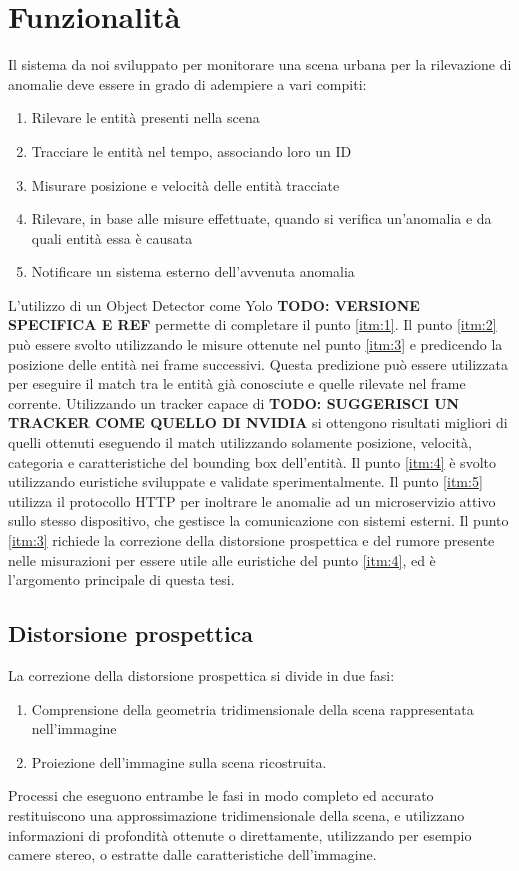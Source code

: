 \chapter{Funzionalità}
\label{sec:funzionalita}

Il sistema da noi sviluppato per monitorare una scena urbana per la rilevazione di anomalie deve essere in grado di adempiere a vari compiti:
\begin{enumerate}
    \item \label{itm:1} Rilevare le entità presenti nella scena
    \item \label{itm:2} Tracciare le entità nel tempo, associando loro un ID
    \item \label{itm:3} Misurare posizione e velocità delle entità tracciate
    \item \label{itm:4} Rilevare, in base alle misure effettuate, quando si verifica un'anomalia e da quali entità essa è causata
    \item \label{itm:5} Notificare un sistema esterno dell'avvenuta anomalia
\end{enumerate}

L'utilizzo di un Object Detector come Yolo \textbf{TODO: VERSIONE SPECIFICA E REF} permette di completare il punto \ref{itm:1}.
Il punto \ref{itm:2} può essere svolto utilizzando le misure ottenute nel punto \ref{itm:3} e predicendo la posizione delle entità nei frame successivi. 
Questa predizione può essere utilizzata per eseguire il match tra le entità già conosciute e quelle rilevate nel frame corrente. 
Utilizzando un tracker capace di \textbf{TODO: SUGGERISCI UN TRACKER COME QUELLO DI NVIDIA} si ottengono risultati migliori di quelli ottenuti eseguendo il match utilizzando solamente posizione, velocità, categoria e caratteristiche del bounding box dell'entità.
Il punto \ref{itm:4} è svolto utilizzando euristiche sviluppate e validate sperimentalmente. 
Il punto \ref{itm:5} utilizza il protocollo HTTP per inoltrare le anomalie ad un microservizio attivo sullo stesso dispositivo, che gestisce la comunicazione con sistemi esterni.
Il punto \ref{itm:3} richiede la correzione della distorsione prospettica e del rumore presente nelle misurazioni per essere utile alle euristiche del punto \ref{itm:4}, ed è l'argomento principale di questa tesi.

\section{Distorsione prospettica}
\label{sec:funzionalita-prospettiva}
La correzione della distorsione prospettica si divide in due fasi:
\begin{enumerate}
    \item Comprensione della geometria tridimensionale della scena rappresentata nell'immagine
    \item Proiezione dell'immagine sulla scena ricostruita.
\end{enumerate}
Processi che eseguono entrambe le fasi in modo completo ed accurato restituiscono una approssimazione tridimensionale della scena, e utilizzano informazioni di profondità ottenute o direttamente, utilizzando per esempio camere stereo, o estratte dalle caratteristiche dell'immagine.

